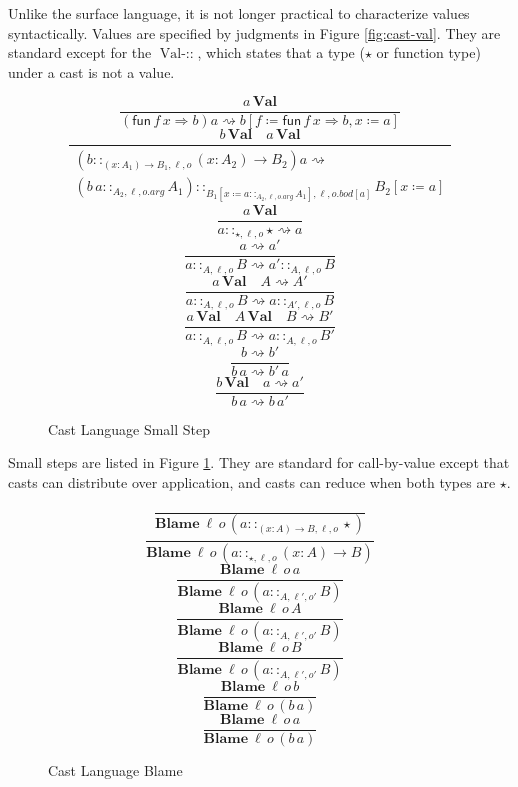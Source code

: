 Unlike the surface language, it is not longer practical to characterize
values syntactically. Values are specified by judgments in Figure
\ref{fig:cast-val}. They are standard except for the $\operatorname{Val-::}$,
which states that a type ($\star$ or function type) under a cast
is not a value.

\begin{figure}
\[
\frac{a\,\textbf{Val}}{\left(\mathsf{fun}\,f\,x\Rightarrow b\right)a\rightsquigarrow b\left[f\coloneqq\mathsf{fun}\,f\,x\Rightarrow b,x\coloneqq a\right]}
\]
\[
\frac{b\,\textbf{Val}\quad a\,\textbf{Val}}{\begin{array}{c}
\left(b::_{\left(x:A_{1}\right)\rightarrow B_{1},\ensuremath{\ell},o}\left(x:A_{2}\right)\rightarrow B_{2}\right)a\rightsquigarrow\\
\left(b\,a::_{A_{2},\ell,o.arg}A_{1}\right)::_{B_{1}\left[x\coloneqq a::_{A_{2},\ell,o.arg}A_{1}\right],\ensuremath{\ell},o.bod[a]}B_{2}\left[x\coloneqq a\right]
\end{array}}
\]
\[
\frac{a\,\textbf{Val}}{a::_{\star,\ensuremath{\ell},o}\star\rightsquigarrow a}
\]
\[
\frac{a\rightsquigarrow a'}{a::_{A,\ensuremath{\ell},o}B\rightsquigarrow a'::_{A,\ensuremath{\ell},o}B}
\]
\[
\frac{a\,\textbf{Val}\quad A\rightsquigarrow A'}{a::_{A,\ensuremath{\ell},o}B\rightsquigarrow a::_{A',\ensuremath{\ell},o}B}
\]
\[
\frac{a\,\textbf{Val}\quad A\,\textbf{Val}\quad B\rightsquigarrow B'}{a::_{A,\ensuremath{\ell},o}B\rightsquigarrow a::_{A,\ensuremath{\ell},o}B'}
\]
\[
\frac{b\rightsquigarrow b'}{b\,a\rightsquigarrow b'\,a}
\]
\[
\frac{b\,\textbf{Val}\quad a\rightsquigarrow a'}{b\,a\rightsquigarrow b\,a'}
\]

\caption{Cast Language Small Step}
\label{fig:cast-step}
\end{figure}

Small steps are listed in Figure \ref{fig:cast-step}. They are standard
for call-by-value except that casts can distribute over application,
and casts can reduce when both types are $\star$.

\begin{figure}
\[
\frac{\,}{\textbf{Blame}\:\ensuremath{\ell}\,o\,\left(a::_{\left(x:A\right)\rightarrow B,\ensuremath{\ell},o}\star\right)}
\]
\[
\frac{\,}{\textbf{Blame}\:\ensuremath{\ell}\,o\,\left(a::_{\star,\ensuremath{\ell},o}\left(x:A\right)\rightarrow B\right)}
\]
\[
\frac{\textbf{Blame}\:\ensuremath{\ell}\,o\,a}{\textbf{Blame}\:\ensuremath{\ell}\,o\,\left(a::_{A,\ensuremath{\ell'},o'}B\right)}
\]
\[
\frac{\textbf{Blame}\:\ensuremath{\ell}\,o\,A}{\textbf{Blame}\:\ensuremath{\ell}\,o\,\left(a::_{A,\ensuremath{\ell'},o'}B\right)}
\]
\[
\frac{\textbf{Blame}\:\ensuremath{\ell}\,o\,B}{\textbf{Blame}\:\ensuremath{\ell}\,o\,\left(a::_{A,\ensuremath{\ell'},o'}B\right)}
\]
\[
\frac{\textbf{Blame}\:\ensuremath{\ell}\,o\,b}{\textbf{Blame}\:\ensuremath{\ell}\,o\,\left(b\,a\right)}
\]
\[
\frac{\textbf{Blame}\:\ensuremath{\ell}\,o\,a}{\textbf{Blame}\:\ensuremath{\ell}\,o\,\left(b\,a\right)}
\]
\caption{Cast Language Blame}
\label{fig:cast-blame}
\end{figure}

